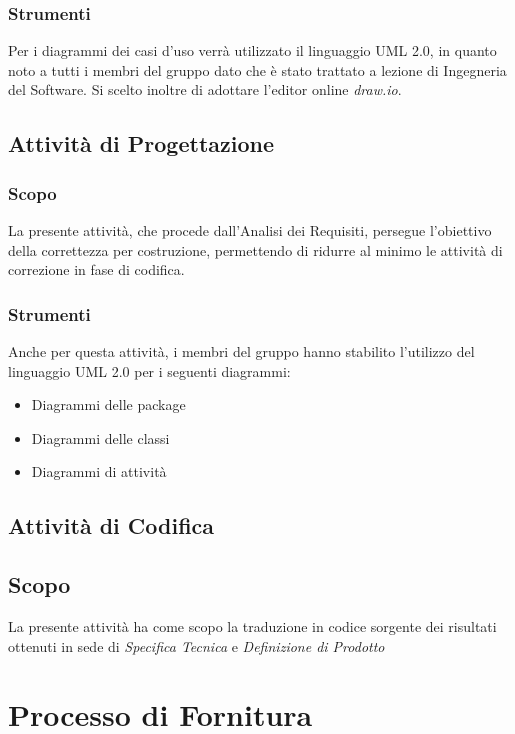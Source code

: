 			
			\subsubsection{Strumenti}
				Per i diagrammi dei casi d'uso verrà utilizzato il linguaggio UML 2.0,
				in quanto noto a tutti i membri del gruppo dato che è stato trattato a lezione
				di Ingegneria del Software.
				Si scelto inoltre di adottare l'editor online \emph{draw.io}.
			
			
		\subsection{Attività di Progettazione}
			\subsubsection{Scopo}
		     La presente attività, che procede dall'Analisi dei Requisiti, persegue l'obiettivo
		     della correttezza per costruzione, permettendo di ridurre al minimo le attività di correzione
		     in fase di codifica.
		
		 
		 
		
		 
		 \subsubsection{Strumenti}
		 Anche per questa attività, i membri del gruppo hanno stabilito l'utilizzo del linguaggio UML 2.0 per i seguenti
		 diagrammi:
		 \begin{itemize}
			\item Diagrammi delle package  
			\item Diagrammi delle classi	
			\item Diagrammi di attività
		\end{itemize}
			 
		
		\subsection{Attività di Codifica}
                \subsection{Scopo}
                La presente attività ha come scopo la traduzione in codice sorgente dei risultati ottenuti in sede
                di \textit{Specifica Tecnica} e \textit{Definizione di Prodotto}
                
                
                
		
	\section{Processo di Fornitura}
